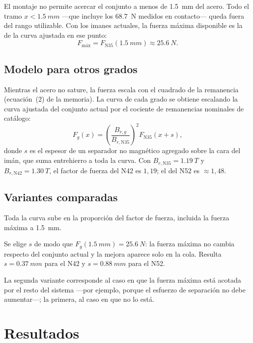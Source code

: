 \documentclass[11pt,a4paper]{article}
\begin{document}
El montaje no permite acercar el conjunto a menos de \SI{1,5}{mm} del acero. Todo el tramo
$x < \SI{1,5}{mm}$ ---que incluye los \SI{68,7}{N} medidos en contacto--- queda fuera del
rango utilizable. Con los imanes actuales, la fuerza máxima disponible es la de la curva
ajustada en ese punto:
\[
F_\text{máx} = F_{\text{N35}}(\SI{1,5}{mm}) \approx \SI{25,6}{N}.
\]

\subsection{Modelo para otros grados}

Mientras el acero no sature, la fuerza escala con el cuadrado de la remanencia (ecuación~(2)
de la memoria). La curva de cada grado se obtiene escalando la curva ajustada del conjunto
actual por el cociente de remanencias nominales de catálogo:
\begin{equation}
F_g(x) = \left(\frac{B_{r,g}}{B_{r,\text{N35}}}\right)^{\!2} F_{\text{N35}}(x + s),
\label{eq:escala}
\end{equation}
donde $s$ es el espesor de un separador no magnético agregado sobre la cara del imán, que
suma entrehierro a toda la curva. Con $B_{r,\text{N35}} = \SI{1,19}{T}$ y
$B_{r,\text{N42}} = \SI{1,30}{T}$, el factor de fuerza del N42 es $1{,}19$; el del N52 es
$\approx 1{,}48$.

\subsection{Variantes comparadas}

\begin{description}[leftmargin=1.5em, font=\normalfont\bfseries]
  \item[Solo cambiar el imán ($s = 0$).] Toda la curva sube en la proporción del factor de
  fuerza, incluida la fuerza máxima a \SI{1,5}{mm}.
  \item[Imán y separador.] Se elige $s$ de modo que $F_g(\SI{1,5}{mm}) = \SI{25,6}{N}$: la
  fuerza máxima no cambia respecto del conjunto actual y la mejora aparece solo en la cola.
  Resulta $s = \SI{0,37}{mm}$ para el N42 y $s = \SI{0,88}{mm}$ para el N52.
\end{description}

La segunda variante corresponde al caso en que la fuerza máxima está acotada por el resto del
sistema ---por ejemplo, porque el esfuerzo de separación no debe aumentar---; la primera, al
caso en que no lo está.

\section{Resultados}
\end{document}
